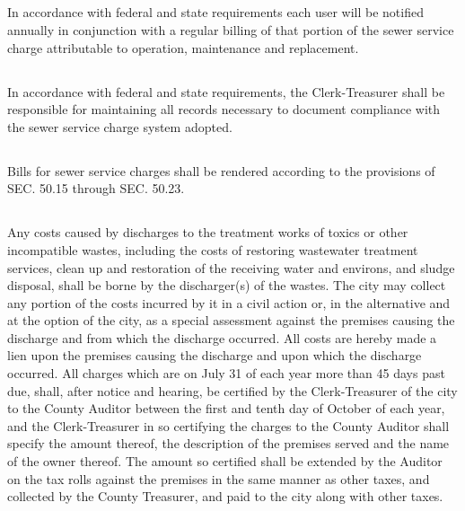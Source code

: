 \subsection{}
In accordance with federal and state requirements each user will be notified annually in conjunction with a regular billing of that portion of the sewer service charge attributable to operation, maintenance and replacement.
\subsection{}
In accordance with federal and state requirements, the Clerk-Treasurer shall be responsible for maintaining all records necessary to document compliance with the sewer service charge system adopted.
\subsection{}
Bills for sewer service charges shall be rendered according to the provisions of SEC. 50.15 through SEC. 50.23.
\subsection{}
Any costs caused by discharges to the treatment works of toxics or other incompatible wastes, including the costs of restoring wastewater treatment services, clean up and restoration of the receiving water and environs, and sludge disposal, shall be borne by the discharger(s) of the wastes.  The city may collect any portion of the costs incurred by it in a civil action or, in the alternative and at the option of the city, as a special assessment against the premises causing the discharge and from which the discharge occurred. All costs are hereby made a lien upon the premises causing the discharge and upon which the discharge occurred. All charges which are on July 31 of each year more than 45 days past due, shall, after notice and hearing, be certified by the Clerk-Treasurer of the city to the County Auditor between the first and tenth day of October of each year, and the Clerk-Treasurer in so certifying the charges to the County Auditor shall specify the amount thereof, the description of the premises served and the name of the owner thereof. The amount so certified shall be extended by the Auditor on the tax rolls against the premises in the same manner as other taxes, and collected by the County Treasurer, and paid to the city along with other taxes.\\


